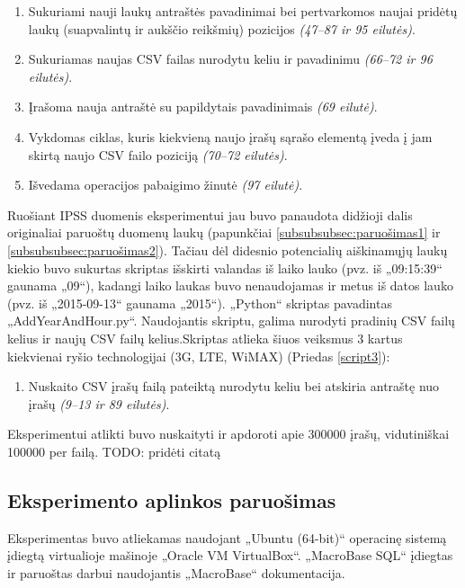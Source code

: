 \documentclass{VUMIFPSbakalaurinis}
\begin{document}
\begin{enumerate}
	\item Sukuriami nauji laukų antraštės pavadinimai bei pertvarkomos naujai pridėtų laukų (suapvalintų ir aukščio reikšmių) pozicijos \textit{(47–87 ir 95 eilutės)}.
	\item Sukuriamas naujas CSV failas nurodytu keliu ir pavadinimu \textit{(66–72 ir 96 eilutės)}.
	\item Įrašoma nauja antraštė su papildytais pavadinimais \textit{(69 eilutė)}.
	\item Vykdomas ciklas, kuris kiekvieną naujo įrašų sąrašo elementą įveda į jam skirtą naujo CSV failo poziciją \textit{(70–72 eilutės)}.
	\item Išvedama operacijos pabaigimo žinutė \textit{(97 eilutė)}.
\end{enumerate}

 \label{subsubsubsec:paruošimas3}
Ruošiant IPSS duomenis eksperimentui jau buvo panaudota didžioji dalis originaliai paruoštų duomenų laukų (papunkčiai \ref{subsubsubsec:paruošimas1} ir \ref{subsubsubsec:paruošimas2}). Tačiau dėl didesnio potencialių aiškinamųjų laukų kiekio buvo sukurtas skriptas išskirti valandas iš laiko lauko (pvz. iš „09:15:39“ gaunama „09“), kadangi laiko laukas buvo nenaudojamas ir metus iš datos lauko (pvz. iš „2015-09-13“ gaunama „2015“). „Python“ skriptas pavadintas „AddYearAndHour.py“. Naudojantis skriptu, galima nurodyti pradinių CSV failų kelius ir naujų CSV failų kelius.Skriptas atlieka šiuos veiksmus 3 kartus kiekvienai ryšio technologijai (3G, LTE, WiMAX) (Priedas \ref{script3}):
\begin{enumerate}
	\item Nuskaito CSV įrašų failą pateiktą nurodytu keliu bei atskiria antraštę nuo įrašų \textit{(9–13 ir 89 eilutės)}. 
\end{enumerate}

Eksperimentui atlikti buvo nuskaityti ir apdoroti apie 300000 įrašų, vidutiniškai 100000 per failą.
TODO: pridėti citatą
\subsection{Eksperimento aplinkos paruošimas}
Eksperimentas buvo atliekamas naudojant „Ubuntu (64-bit)“ operacinę sistemą įdiegtą virtualioje mašinoje „Oracle VM VirtualBox“. „MacroBase SQL“ įdiegtas ir paruoštas darbui naudojantis „MacroBase“ dokumentacija.
\end{document}
